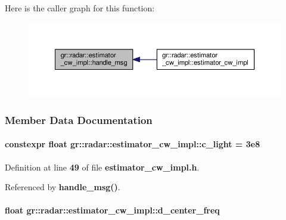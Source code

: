 Here is the caller graph for this function\+:
\nopagebreak
\begin{figure}[H]
\begin{center}
\leavevmode
\includegraphics[width=350pt]{d2/dbf/classgr_1_1radar_1_1estimator__cw__impl_a198fde7bf21cc25a2e215c831cc3bdf9_icgraph}
\end{center}
\end{figure}




\subsubsection{Member Data Documentation}
\paragraph[{c\+\_\+light}]{\setlength{\rightskip}{0pt plus 5cm}constexpr float gr\+::radar\+::estimator\+\_\+cw\+\_\+impl\+::c\+\_\+light = 3e8\hspace{0.3cm}{\ttfamily [static]}}\label{classgr_1_1radar_1_1estimator__cw__impl_a089ea1489921ff39ac685c59164f3bb2}


Definition at line {\bf 49} of file {\bf estimator\+\_\+cw\+\_\+impl.\+h}.



Referenced by {\bf handle\+\_\+msg()}.

\paragraph[{d\+\_\+center\+\_\+freq}]{\setlength{\rightskip}{0pt plus 5cm}float gr\+::radar\+::estimator\+\_\+cw\+\_\+impl\+::d\+\_\+center\+\_\+freq}\label{classgr_1_1radar_1_1estimator__cw__impl_a8a411c520f575a8569c4800bd9f8274e}


